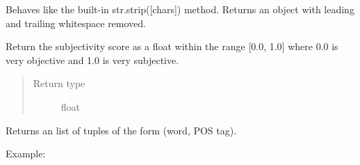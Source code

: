 \documentclass[letterpaper,10pt,english]{sphinxmanual}
\begin{document}
\begin{fulllineitems}
\begin{fulllineitems}
\end{fulllineitems}


\begin{fulllineitems}
\label{api_reference:textblob_de.blob.TextBlobDE.strip}
Behaves like the built-in str.strip({[}chars{]}) method. Returns
an object with leading and trailing whitespace removed.

\end{fulllineitems}


\begin{fulllineitems}
\label{api_reference:textblob_de.blob.TextBlobDE.subjectivity}
Return the subjectivity score as a float within the range {[}0.0, 1.0{]}
where 0.0 is very objective and 1.0 is very subjective.
\begin{quote}\begin{description}
\item[{Return type}] \leavevmode
float

\end{description}\end{quote}

\end{fulllineitems}


\begin{fulllineitems}
\label{api_reference:textblob_de.blob.TextBlobDE.tags}
Returns an list of tuples of the form (word, POS tag).

Example:


\end{fulllineitems}
\end{fulllineitems}
\end{document}
